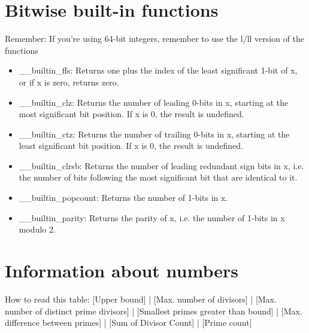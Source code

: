 \section{Bitwise built-in functions}
	Remember: If you're using 64-bit integers, remember to use the l/ll version of the functions
	\begin{itemize}
  		\item \_\_builtin\_ffs: Returns one plus the index of the least significant 1-bit of x, or if x is zero, returns zero.
  		\item \_\_builtin\_clz: Returns the number of leading 0-bits in x, starting at the most significant bit position. If x is 0, the result is undefined.
  		\item \_\_builtin\_ctz: Returns the number of trailing 0-bits in x, starting at the least significant bit position. If x is 0, the result is undefined.
		\item \_\_builtin\_clrsb: Returns the number of leading redundant sign bits in x, i.e. the number of bits following the most significant bit that are identical to it.
		\item \_\_builtin\_popcount: Returns the number of 1-bits in x.
		\item \_\_builtin\_parity: Returns the parity of x, i.e. the number of 1-bits in x modulo 2.
	\end{itemize}




\section{Information about numbers}
		How to read this table: [Upper bound] | [Max. number of divisors] | [Max. number of distinct prime divisors] | [Smallest primes greater than bound] | [Max. difference between primes] | [Sum of Divisor Count] | [Prime count]


